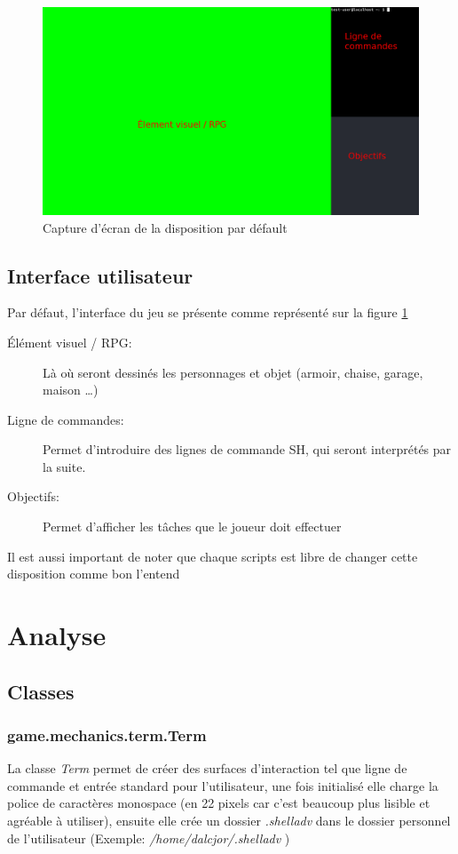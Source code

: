 \documentclass{report}
\begin{document}
\newpage

\begin{figure}[hb!]
  \includegraphics[width=\linewidth]{img/image1}
  \caption{Capture d'écran de la disposition par défault}
  \label{fig:screen1}
\end{figure}
\section {Interface utilisateur}
Par défaut, l’interface du jeu se présente comme représenté sur la figure \ref{fig:screen1}
\begin{description}
  \item [Élément visuel / RPG:] Là où seront dessinés les personnages et objet (armoir, chaise, garage, maison …)
  \item [Ligne de commandes:] Permet d’introduire des lignes de commande SH, qui seront interprétés par la suite.
  \item [Objectifs:] Permet d’afficher les tâches que le joueur doit effectuer
\end{description}
\par Il est aussi important de noter que chaque scripts est libre de changer cette disposition comme bon
l'entend


\chapter{Analyse}
\section{Classes}
\subsection{game.mechanics.term.Term}
La classe \emph{Term} permet de créer des surfaces d'interaction tel que ligne de commande et entrée standard pour l’utilisateur, une fois initialisé elle charge la police de caractères monospace (en 22 pixels car c’est beaucoup plus lisible et agréable à utiliser), ensuite elle crée un dossier \emph{.shelladv} dans le dossier personnel de l’utilisateur (Exemple: \emph{/home/dalcjor/.shelladv} )
\end{document}
